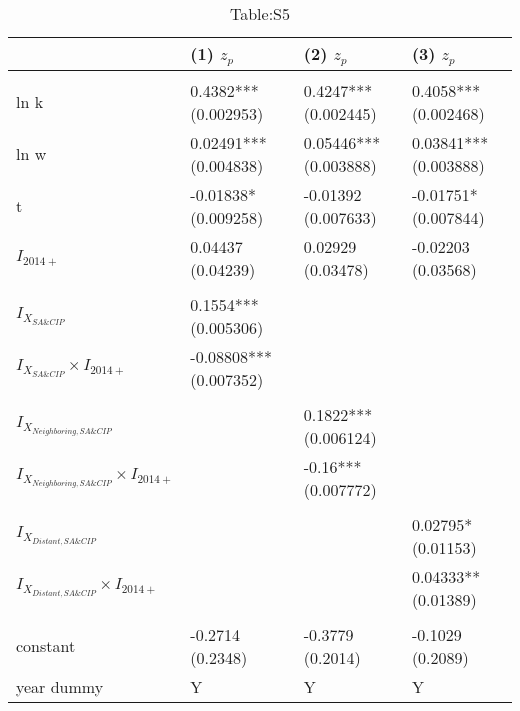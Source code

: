 \documentclass[
]{article}
\begin{document}
\begin{table}

\caption{\label{tab:s5}Table:S5}
\centering
\begin{tabular}[t]{llll}
\toprule
  & (1) 
 $ z_{p}$ & (2) 
 $ z_{p}$ & (3) 
 $ z_{p}$\\
\midrule
\addlinespace[0.3em]
\hline
\multicolumn{4}{l}{\textbf{ }}\\
\hspace{1em}ln k & 0.4382*** (0.002953) & 0.4247*** (0.002445) & 0.4058*** (0.002468)\\
\hspace{1em}ln w & 0.02491*** (0.004838) & 0.05446*** (0.003888) & 0.03841*** (0.003888)\\
\hspace{1em}t & -0.01838* (0.009258) & -0.01392  (0.007633) & -0.01751* (0.007844)\\
\hspace{1em}$I_{2014+}$ & 0.04437  (0.04239) & 0.02929  (0.03478) & -0.02203  (0.03568)\\
\addlinespace[0.3em]
\hline
\multicolumn{4}{l}{\textbf{ }}\\
\hspace{1em}$I_{X_{SA\&CIP}}$ & 0.1554*** (0.005306) &  & \\
\hspace{1em}$I_{X_{SA\&CIP}}\times I_{2014+}$ & -0.08808*** (0.007352) &  & \\
\addlinespace[0.3em]
\hline
\multicolumn{4}{l}{\textbf{ }}\\
\hspace{1em}$I_{X_{Neighboring,SA\&CIP}}$ &  & 0.1822*** (0.006124) & \\
\hspace{1em}$I_{X_{Neighboring,SA\&CIP}}\times I_{2014+}$ &  & -0.16*** (0.007772) & \\
\addlinespace[0.3em]
\hline
\multicolumn{4}{l}{\textbf{ }}\\
\hspace{1em}$I_{X_{Distant,SA\&CIP}}$ &  &  & 0.02795* (0.01153)\\
\hspace{1em}$I_{X_{Distant,SA\&CIP}}\times I_{2014+} $ &  &  & 0.04333** (0.01389)\\
\addlinespace[0.3em]
\hline
\multicolumn{4}{l}{\textbf{ }}\\
\hspace{1em}constant & -0.2714 (0.2348) & -0.3779 (0.2014) & -0.1029 (0.2089)\\
\hspace{1em}year dummy & Y & Y & Y\\

\end{tabular}
\end{table}
\end{document}

